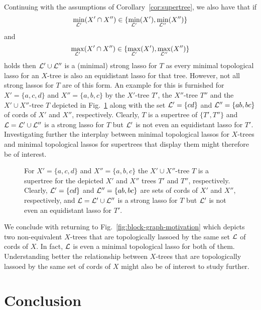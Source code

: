 Continuing with the assumptions of Corollary~\ref{cor:supertree}, we also have
that if
\begin{equation*}
  \min_{{\mathcal L}'}(X'\cap X'')\in \{\min_{{\mathcal L}'}(X'), \min_{{\mathcal L}''}(X'')\}
\end{equation*}
and
\begin{equation*}
  \max_{{\mathcal L}'}(X'\cap X'')\in \{\max_{{\mathcal L}'}(X'), \max_{{\mathcal L}''}(X'')\}
\end{equation*}
holds then ${\mathcal L}'\cup {\mathcal L}''$ is a (minimal) strong lasso for $T$ as every
minimal topological lasso for an $X$-tree is also an equidistant lasso for
that tree. However, not all strong lassos for $T$ are of this form. An example
for this is furnished for $X'=\{a,c,d\}$ and $X''=\{a,b,c\}$ by the $X'$-tree
$T'$, the $X''$-tree $T''$ and the $X'\cup X''$-tree $T$ depicted in
Fig.~\ref{fig:supertree} along with the set ${\mathcal L}'=\{cd\}$ and
${\mathcal L}''=\{ab,bc\}$ of cords of $X'$ and $X''$, respectively. Clearly, $T$ is a
supertree of $\{T',T''\}$ and ${\mathcal L}={\mathcal L}'\cup{\mathcal L}''$ is a strong lasso for $T$
but ${\mathcal L}'$ is not even an equidistant lasso for $T'$. Investigating further
the interplay between minimal topological lassos for $X$-trees and minimal
topological lassos for supertrees that display them might therefore be of
interest.

\begin{figure}
  \begin{center}
    
  \end{center}
  \caption{ For $X'=\{a,c,d\}$ and $X''=\{a,b,c\}$ the $X'\cup X''$-tree $T$
    is a supertree for the depicted $X'$ and $X''$ trees $T'$ and $T''$,
    respectively. Clearly, ${\mathcal L}'=\{cd\}$ and ${\mathcal L}''=\{ab,bc\}$ are sets of
    cords of $X'$ and $X''$, respectively, and ${\mathcal L}={\mathcal L}'\cup{\mathcal L}''$ is a strong
    lasso for $T$ but ${\mathcal L}'$ is not even an equidistant lasso for $T'$.  }
  \label{fig:supertree}
\end{figure}

We conclude with returning to Fig.~\ref{fig:block-graph-motivation} which
depicts two non-equivalent $X$-trees that are topologically lassoed by the
same set ${\mathcal L}$ of cords of $X$. In fact, ${\mathcal L}$ is even a minimal topological
lasso for both of them.  Understanding better the relationship between
$X$-trees that are topologically lassoed by the same set of cords of $X$ might
also be of interest to study further.

\section{Conclusion}
\label{sec:conclusion-dist}

